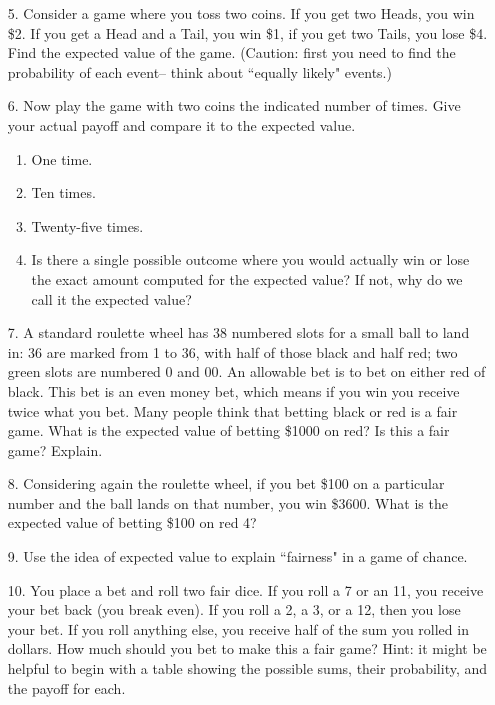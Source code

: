 \begin{enumerate}
\item[5.] Consider a game where you toss two coins. If you get two Heads, you win \$2. If you get a Head and a Tail, you win \$1, if you get two Tails, you lose \$4. Find the expected value of the game. (Caution: first you need to find the probability of each event-- think about ``equally likely" events.)
\vspace{.1in}

\item[6.] Now play the game with two coins the indicated number of times. Give your actual payoff and compare it to the expected value.
\begin{enumerate}
\item One time.
\item Ten times.
\item Twenty-five times.
\item Is there a single possible outcome where you would actually win or lose the exact amount computed for the expected value? If not, why do we call it the expected value?
\end{enumerate}
\vspace{.1in}

\item[7.] A standard roulette wheel has 38 numbered slots for a small ball to land in: 36 are marked from 1 to 36, with half of those black and half red; two green slots are numbered 0 and 00. An allowable bet is to bet on either red of black. This bet is an even money bet, which means if you win you receive twice what you bet. Many people think that betting black or red is a fair game. What is the expected value of betting \$1000 on red? Is this a fair game? Explain.
\vspace{.1in}

\item[8.] Considering again the roulette wheel, if you bet \$100 on a particular number and the ball lands on that number, you win \$3600. What is the expected value of betting \$100 on red 4?
\vspace{.1in}

\item[9.] Use the idea of expected value to explain ``fairness" in a game of chance.
\vspace{.1in}

\item[10.] You place a bet and roll two fair dice. If you roll a 7 or an 11, you receive your bet back (you break even). If you roll a 2, a 3, or a 12, then you lose your bet.  If you roll anything else, you receive half of the sum you rolled in dollars. How much should you bet to make this a fair game? Hint: it might be helpful to begin with a table showing the possible sums, their probability, and the payoff for each. 

\end{enumerate}

